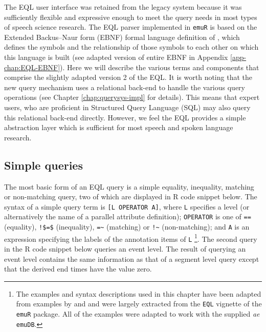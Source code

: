 \documentclass[]{book}
\let\rmarkdownfootnote\footnote%
\def\footnote{\protect\rmarkdownfootnote}
\begin{document}
The EQL user interface was retained from the legacy system because it was sufficiently flexible and expressive enough to meet the query needs in most types of speech science research. The EQL parser implemented in \texttt{emuR} is based on the Extended Backus--Naur form (EBNF) \citep{garshol:2003a} formal language definition of \citet{john:2012a}, which defines the symbols and the relationship of those symbols to each other on which this language is built (see adapted version of entire EBNF in Appendix \ref{app-chap:EQL-EBNF}). Here we will describe the various terms and components that comprise the slightly adapted version 2 of the EQL. It is worth noting that the new query mechanism uses a relational back-end to handle the various query operations (see Chapter \ref{chap:querysys-impl} for details). This means that expert users, who are proficient in Structured Query Language (SQL) may also query this relational back-end directly. However, we feel the EQL provides a simple abstraction layer which is sufficient for most speech and spoken language research.

\hypertarget{simple-queries}{%
\subsection{Simple queries}\label{simple-queries}}

The most basic form of an EQL query is a simple equality, inequality, matching or non-matching query, two of which are displayed in R code snippet below. The syntax of a simple query term is \texttt{{[}L\ OPERATOR\ A{]}}, where \texttt{L} specifies a level (or alternatively the name of a parallel attribute definition); \texttt{OPERATOR} is one of \texttt{==} (equality), \texttt{!\$=\$} (inequality), \texttt{=\textasciitilde{}} (matching) or \texttt{!\textasciitilde{}} (non-matching); and \texttt{A} is an expression specifying the labels of the annotation items of \texttt{L} \footnote{The examples and syntax descriptions used in this chapter have been adapted from examples by \citet{cassidy:sc2001a} and \citet{harrington:2002aa} and were largely extracted from the \texttt{EQL} vignette of the \texttt{emuR} package. All of the examples were adapted to work with the supplied \emph{ae} \texttt{emuDB}.}. The second query in the R code snippet below queries an event level. The result of querying an event level contains the same information as that of a segment level query except that the derived end times have the value zero.
\end{document}
